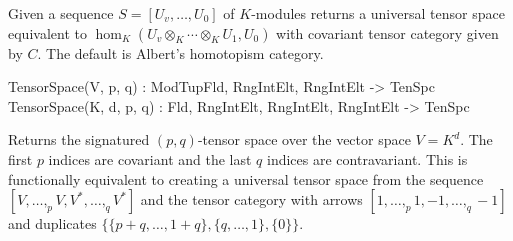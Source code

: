 Given a sequence $S=[U_v,\dots, U_0]$ of $K$-modules returns a universal tensor 
space equivalent to $\hom_K(U_v\otimes_K\cdots\otimes_K U_1,U_0)$ with covariant tensor 
category given by $C$. The default is Albert's homotopism category. 

\begin{intrinsics}
TensorSpace(V, p, q) : ModTupFld, RngIntElt, RngIntElt -> TenSpc
TensorSpace(K, d, p, q) : Fld, RngIntElt, RngIntElt, RngIntElt -> TenSpc
\end{intrinsics}

Returns the signatured $(p,q)$-tensor space over the vector space $V=K^d$. 
The first $p$ indices are covariant and the last $q$ indices are contravariant.  
This is functionally equivalent
to creating a universal tensor space from the sequence 
$[V,\dots,_p V, V^*,\dots,_q V^*]$
and the tensor category with arrows $[1,\dots,_p 1, -1,\dots,_q -1]$ and 
duplicates $\{\{p+q,\dots,1+q\},\{q,\dots,1\},\{0\}\}$.

